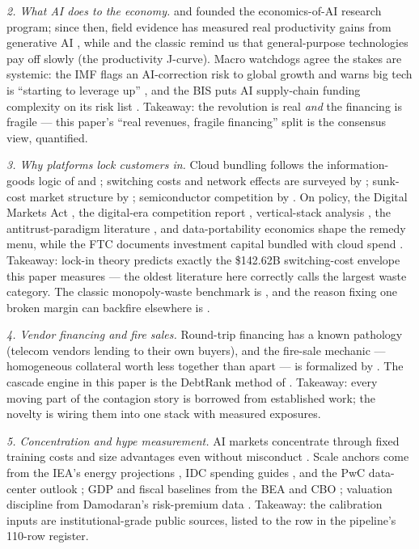\documentclass[11pt,a4paper]{article}
\begin{document}
\emph{2. What AI does to the economy.} \citet{agrawal2018} and
\citet{agrawal2019} founded the economics-of-AI research program; since then,
field evidence has measured real productivity gains from generative AI
\citep{brynjolfsson2025, noy2023}, while \citet{brynjolfsson2021} and the
classic \citet{david1990} remind us that general-purpose technologies pay off
slowly (the productivity J-curve). Macro watchdogs agree the stakes are
systemic: the IMF flags an AI-correction risk to global growth
\citep{imf2026b} and warns big tech is ``starting to leverage up''
\citep{imf2026}, and the BIS puts AI supply-chain funding complexity on its
risk list \citep{bis2026}. Takeaway: the revolution is real \emph{and} the
financing is fragile --- this paper's ``real revenues, fragile financing''
split is the consensus view, quantified.

\emph{3. Why platforms lock customers in.} Cloud bundling follows the
information-goods logic of \citet{shapiro1999} and \citet{bakos2000};
switching costs and network effects are surveyed by \citet{farrell2007};
sunk-cost market structure by \citet{sutton1991}; semiconductor competition
by \citet{scherer1990}. On policy, the Digital Markets Act \citep{eu2022},
the digital-era competition report \citep{cremer2019}, vertical-stack
analysis \citep{hagiu2025}, the antitrust-paradigm literature
\citep{baker2019}, and data-portability economics \citep{kramer2020} shape
the remedy menu, while the FTC documents investment capital bundled with
cloud spend \citep{ftc2025}. Takeaway: lock-in theory predicts exactly the
\$142.62B switching-cost envelope this paper measures --- the oldest
literature here correctly calls the largest waste category. The classic
monopoly-waste benchmark is \citet{harberger1954}, and the reason fixing one
broken margin can backfire elsewhere is \citet{lipsey1956}.

\emph{4. Vendor financing and fire sales.} Round-trip financing has a known
pathology (telecom vendors lending to their own buyers), and the fire-sale
mechanic --- homogeneous collateral worth less together than apart --- is
formalized by \citet{shleifer1992}. The cascade engine in this paper is the
DebtRank method of \citet{battiston2012}. Takeaway: every moving part of the
contagion story is borrowed from established work; the novelty is wiring
them into one stack with measured exposures.

\emph{5. Concentration and hype measurement.} AI markets concentrate through
fixed training costs and size advantages even without misconduct
\citep{korinek2025}. Scale anchors come from the IEA's energy projections
\citep{iea2026}, IDC spending guides \citep{idc2026}, and the PwC data-center
outlook \citep{pwc2026}; GDP and fiscal baselines from the BEA \citep{bea2026}
and CBO \citep{cbo2022}; valuation discipline from Damodaran's risk-premium
data \citep{damodaran2026}. Takeaway: the calibration inputs are
institutional-grade public sources, listed to the row in the pipeline's
110-row register.
\end{document}

